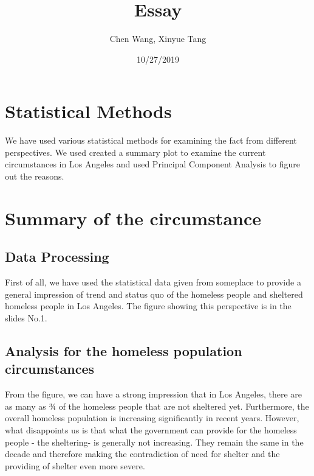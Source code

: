 \documentclass[]{article}
\title{Essay}
\author{Chen Wang, Xinyue Tang}
\date{10/27/2019}
\begin{document}
\maketitle

{
\setcounter{tocdepth}{3}
\tableofcontents
}
\hypertarget{statistical-methods}{%
\section{Statistical Methods}\label{statistical-methods}}

We have used various statistical methods for examining the fact from
different perspectives. We used created a summary plot to examine the
current circumstances in Los Angeles and used Principal Component
Analysis to figure out the reasons.

\hypertarget{summary-of-the-circumstance}{%
\section{Summary of the
circumstance}\label{summary-of-the-circumstance}}

\hypertarget{data-processing}{%
\subsection{Data Processing}\label{data-processing}}

First of all, we have used the statistical data given from someplace to
provide a general impression of trend and status quo of the homeless
people and sheltered homeless people in Los Angeles. The figure showing
this perspective is in the slides No.1.

\hypertarget{analysis-for-the-homeless-population-circumstances}{%
\subsection{Analysis for the homeless population
circumstances}\label{analysis-for-the-homeless-population-circumstances}}

From the figure, we can have a strong impression that in Los Angeles,
there are as many as ¾ of the homeless people that are not sheltered
yet. Furthermore, the overall homeless population is increasing
significantly in recent years. However, what disappoints us is that what
the government can provide for the homeless people - the sheltering- is
generally not increasing. They remain the same in the decade and
therefore making the contradiction of need for shelter and the providing
of shelter even more severe.
\end{document}
